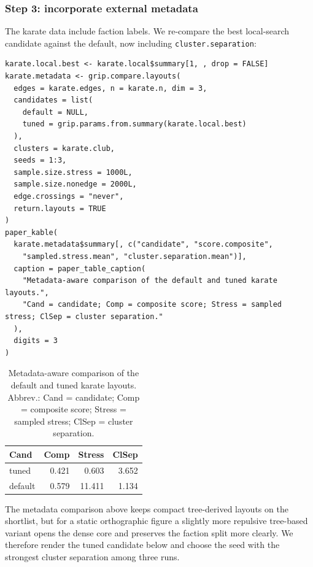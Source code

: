 \subsubsection{Step 3: incorporate external metadata}\label{step-3-incorporate-external-metadata}

The karate data include faction labels. We re-compare the best local-search
candidate against the default, now including \texttt{cluster.separation}:

\begin{verbatim}
karate.local.best <- karate.local$summary[1, , drop = FALSE]
karate.metadata <- grip.compare.layouts(
  edges = karate.edges, n = karate.n, dim = 3,
  candidates = list(
    default = NULL,
    tuned = grip.params.from.summary(karate.local.best)
  ),
  clusters = karate.club,
  seeds = 1:3,
  sample.size.stress = 1000L,
  sample.size.nonedge = 2000L,
  edge.crossings = "never",
  return.layouts = TRUE
)
paper_kable(
  karate.metadata$summary[, c("candidate", "score.composite",
    "sampled.stress.mean", "cluster.separation.mean")],
  caption = paper_table_caption(
    "Metadata-aware comparison of the default and tuned karate layouts.",
    "Cand = candidate; Comp = composite score; Stress = sampled stress; ClSep = cluster separation."
  ),
  digits = 3
)
\end{verbatim}

\begin{table}

\caption{\label{tab:unnamed-chunk-9}Metadata-aware comparison of the default and tuned karate layouts. Abbrev.: Cand = candidate; Comp = composite score; Stress = sampled stress; ClSep = cluster separation.}
\centering
\begin{tabular}[t]{l|r|r|r}
\hline
Cand & Comp & Stress & ClSep\\
\hline
tuned & 0.421 & 0.603 & 3.652\\
\hline
default & 0.579 & 11.411 & 1.134\\
\hline
\end{tabular}
\end{table}

The metadata comparison above keeps compact tree-derived layouts on the
shortlist, but for a static orthographic figure a slightly more repulsive
tree-based variant opens the dense core and preserves the faction split more
clearly. We therefore render the tuned candidate below and choose the seed
with the strongest cluster separation among three runs.


